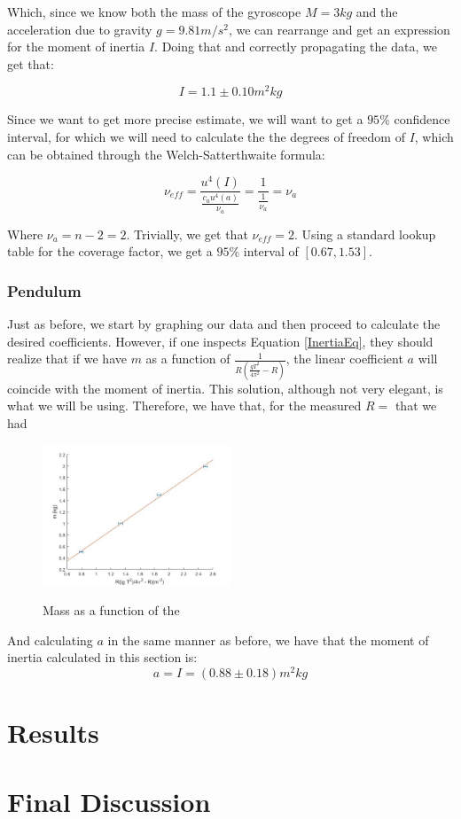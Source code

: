 \documentclass[a4paper,12pt]{article}
\begin{document}
Which, since we know both the mass of the gyroscope $M = 3kg$ and the acceleration due to gravity $g = 9.81 m/s^2$, we can rearrange and get an expression for the moment of inertia $I$. Doing that and correctly propagating the data, we get that:

\begin{equation}
  \label{Inertia1}
  I = 1.1 \pm 0.10 m^2kg
\end{equation}

Since we want to get more precise estimate, we will want to get a $95\%$ confidence interval, for which we will need to calculate the the degrees of freedom of $I$, which can be obtained through the Welch-Satterthwaite formula:

$$\nu_{eff} = \frac{u^4(I)}{\frac{c_a u^4(a)}{\nu_a}} =\frac{1}{\frac{1}{\nu_a}} = \nu_a $$


Where $\nu_a = n - 2 = 2$. Trivially, we get that $\nu_{eff} = 2$. Using a standard lookup table for the coverage factor, we get a $95\%$  interval of $[0.67, 1.53]$. 


\subsubsection{Pendulum}
Just as before, we start by graphing our data and then proceed to calculate the desired coefficients. However, if one inspects Equation \eqref{InertiaEq}, they should realize that if we have $m$ as a function of $\frac{1}{R\left(\frac{g T^2}{4\pi^2} - R\right)}$, the linear coefficient $a$ will coincide with the moment of inertia. This solution, although not very elegant, is what we will be using. Therefore, we have that, for the measured $R = $ that we had  

\begin{figure}[H]
	\caption{Mass as a function of the }
	\includegraphics[width=0.5\textwidth]{part3.jpg}
	\label{foda3}
\end{figure} 

And calculating $a$ in the same manner as before, we have that the moment of inertia calculated in this section is:
\begin{equation}
	a = I = \left(0.88 \pm 0.18\right) m^2 kg
\end{equation}


\section{Results}

\section{Final Discussion}
\end{document}
